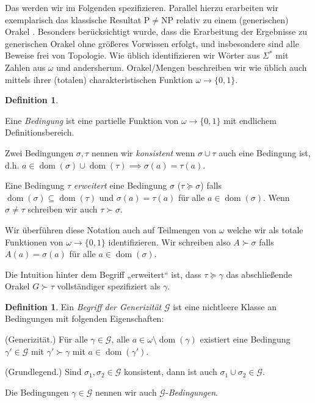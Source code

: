 \documentclass[nofonts]{uebung}
\theoremstyle{definition}
\newtheorem{definition}[theorem]{Definition}
\def\P{\ensuremath{\mathrm{P}}}
\def\NP{\ensuremath{\mathrm{NP}}}
\DeclareMathOperator{\dom}{dom}
\begin{document}
Das werden wir im Folgenden spezifizieren. Parallel hierzu erarbeiten wir exemplarisch das klassische Resultat $\P\neq\NP$ relativ zu einem (generischen) Orakel \parencite{baker_relativizations_1975}.
Besonders berücksichtigt wurde, dass die Erarbeitung der Ergebnisse zu generischen Orakel ohne größeres Vorwissen erfolgt, und insbesondere sind alle Beweise frei von Topologie.
Wie üblich identifizieren wir Wörter aus $\Sigma^*$ mit Zahlen aus $\omega$ und andersherum.
Orakel/Mengen beschreiben wir wie üblich auch mittels ihrer (totalen) charakteristischen Funktion $\omega\to\{0,1\}$.

\begin{definition}\begin{thmenum}
    \item Eine \emph{Bedingung} ist eine partielle Funktion von $\omega \to \{0,1\}$ mit endlichem Definitionsbereich.
        \item Zwei Bedingungen $\sigma,\tau$ nennen wir \emph{konsistent} wenn $\sigma\cup\tau$ auch eine Bedingung ist, d.h. $a\in\dom(\sigma)\cup\dom(\tau)\implies \sigma(a)=\tau(a)$.
    \item Eine Bedingung $\tau$ \emph{erweitert} eine Bedingung $\sigma$ ($\tau\succeq \sigma$) falls $\dom(\sigma)\subseteq\dom(\tau)$ und $\sigma(a)=\tau(a)$ für alle $a\in\dom(\sigma)$.
    Wenn $\sigma\neq\tau$ schreiben wir auch $\tau\succ\sigma$.
    \item Wir überführen diese Notation auch auf Teilmengen von $\omega$ welche wir als totale Funktionen von $\omega\to\{0,1\}$ identifizieren.
    Wir schreiben also $A\succ \sigma$ falls $A(a)=\sigma(a)$ für alle $a\in\dom(\sigma)$.
\end{thmenum}
\end{definition}
Die Intuition hinter dem Begriff „erweitert“ ist, dass $\tau\succeq \gamma$ das abschließende Orakel $G\succ\tau$ vollständiger spezifiziert als $\gamma$.

\begin{definition}\label{def:generizität}
    Ein \emph{Begriff der Generizität} $\mathcal G$ ist eine nichtleere Klasse an Bedingungen mit folgenden Eigenschaften:
    \begin{thmenum}
        \item\label{def:generizität-ext} (Generizität.) Für alle $\gamma\in\mathcal G$, alle $a\in \omega\setminus\dom(\gamma)$ existiert eine Bedingung $\gamma'\in\mathcal G$ mit $\gamma'\succ \gamma$ mit $a\in\dom(\gamma')$.
        \item\label{def:generizität-grundlegend} (Grundlegend.) Sind $\sigma_1, \sigma_2\in\mathcal G$ konsistent, dann ist auch $\sigma_1\cup\sigma_2\in\mathcal G$.
    \end{thmenum}
    Die Bedingungen $\gamma\in \mathcal G$ nennen wir auch $\mathcal G$-\emph{Bedingungen}.
\end{definition}
\end{document}
